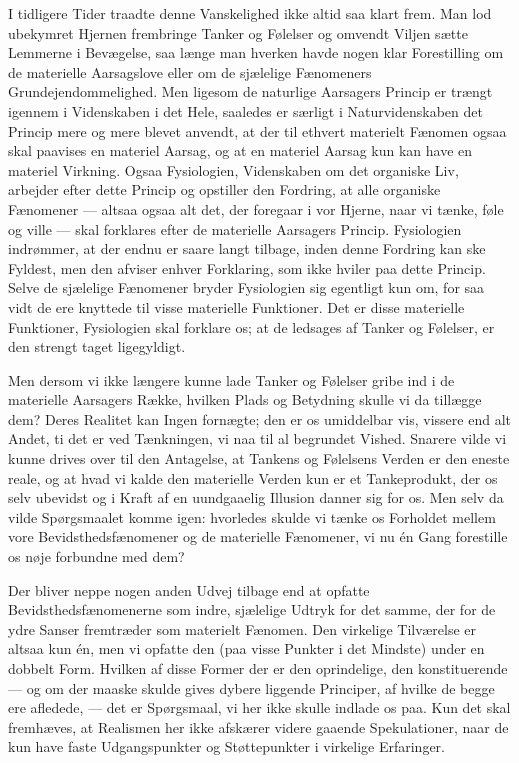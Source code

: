 \documentclass[12pt,a4paper]{article}
\begin{document}
I tidligere Tider traadte denne Vanskelighed ikke altid saa klart frem.
Man lod ubekymret Hjernen frembringe Tanker og Følelser og omvendt
Viljen sætte Lemmerne i Bevægelse, saa længe man hverken havde nogen
klar Forestilling om de materielle Aarsagslove eller om de sjælelige
Fænomeners Grundejendommelighed. Men ligesom de naturlige Aarsagers
Princip er trængt igennem i Videnskaben i det Hele, saaledes er særligt
i Naturvidenskaben det Princip mere og mere blevet anvendt, at der til
ethvert materielt Fænomen ogsaa skal paavises en materiel Aarsag, og at
en materiel Aarsag kun kan have en materiel Virkning. Ogsaa Fysiologien,
Videnskaben om det organiske Liv, arbejder efter dette Princip og
opstiller den Fordring, at alle organiske Fænomener --- altsaa ogsaa
alt det, der foregaar i vor Hjerne, naar vi tænke, føle og ville ---
skal forklares efter de materielle Aarsagers Princip. Fysiologien
indrømmer, at der endnu er saare langt tilbage, inden denne Fordring kan
ske Fyldest, men den afviser enhver Forklaring, som ikke hviler paa
dette Princip. Selve de sjælelige Fænomener bryder Fysiologien sig
egentligt kun om, for saa vidt de ere knyttede til visse materielle
Funktioner. Det er disse materielle Funktioner, Fysiologien skal forklare
os; at de ledsages af Tanker og Følelser, er den strengt taget ligegyldigt.

Men dersom vi ikke længere kunne lade Tanker og Følelser gribe ind i de
materielle Aarsagers Række, hvilken Plads og Betydning skulle vi da
tillægge dem? Deres Realitet kan Ingen fornægte; den er os umiddelbar
vis, vissere end alt Andet, ti det er ved Tænkningen, vi naa til al
begrundet Vished. Snarere vilde vi kunne drives over til den Antagelse,
at Tankens og Følelsens Verden er den eneste reale, og at hvad vi kalde
den materielle Verden kun er et Tankeprodukt, der os selv ubevidst og i
Kraft af en uundgaaelig Illusion danner sig for os. Men selv da vilde
Spørgsmaalet komme igen: hvorledes skulde vi tænke os Forholdet mellem
vore Bevidsthedsfænomener og de materielle Fænomener, vi nu én Gang
forestille os nøje forbundne med dem?

Der bliver neppe nogen anden Udvej tilbage end at opfatte
Bevidsthedsfænomenerne som indre, sjælelige Udtryk for det samme, der
for de ydre Sanser fremtræder som materielt Fænomen. Den virkelige
Tilværelse er altsaa kun én, men vi opfatte den (paa visse Punkter i
det Mindste) under en dobbelt Form. Hvilken af disse Former der er den
oprindelige, den konstituerende --- og om der maaske skulde gives dybere
liggende Principer, af hvilke de begge ere afledede, --- det er
Spørgsmaal, vi her ikke skulle indlade os paa. Kun det skal fremhæves,
at Realismen her ikke afskærer videre gaaende Spekulationer, naar de
kun have faste Udgangspunkter og Støttepunkter i virkelige Erfaringer.
\end{document}
